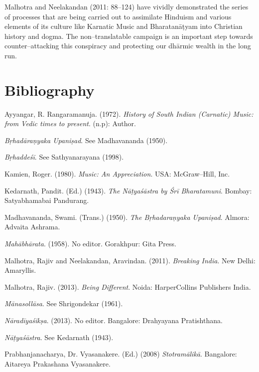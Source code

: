 Malhotra and Neelakandan (2011: 88–124) have vividly demonstrated the series of processes that are being carried out to assimilate Hinduism and various elements of its culture like Karnatic Music and Bharatanāṭyam into Christian history and dogma. The non–translatable campaign is an important step towards counter–attacking this conspiracy and protecting our dhārmic wealth in the long run.


\section*{Bibliography}

\begin{thebibliography}{99}
\itemsep=0pt
 Ayyangar, R. Rangaramanuja. (1972). \textit{History of South Indian (Carnatic) Music: from Vedic times to present}. (n.p): Author.

  \textit{Bṛhadāraṇyaka Upaniṣad}. See Madhavananda (1950).

  \textit{Bṛhaddeśī}. See Sathyanarayana (1998).

  Kamien, Roger. (1980). \textit{Music: An Appreciation}. USA: McGraw–Hill, Inc.

  Kedarnath, Pandit. (Ed.) (1943). \textit{The Nāṭyaśāstra by Śrī Bharatamuni}. Bombay: Satyabhamabai Pandurang.

  Madhavananda, Swami. (Trans.) (1950). \textit{The Bṛhadaraṇyaka Upaniṣad}. Almora: Advaita Ashrama.

  \textit{Mahābhārata}. (1958). No editor. Gorakhpur: Gita Press.

  Malhotra, Rajiv and Neelakandan, Aravindan. (2011). \textit{Breaking India}. New Delhi: Amaryllis.

  Malhotra, Rajiv. (2013). \textit{Being Different}. Noida: HarperCollins Publishers India.

  \textit{Mānasollāsa}. See Shrigondekar (1961).

  \textit{Nāradīyaśikṣa}. (2013). No editor. Bangalore: Drahyayana Pratishthana.

  \textit{Nāṭyaśāstra}. See Kedarnath (1943).

  Prabhanjanacharya, Dr. Vyasanakere. (Ed.) (2008) \textit{Stotramālikā}. Bangalore: Aitareya Prakashana Vyasanakere.


\end{thebibliography}
